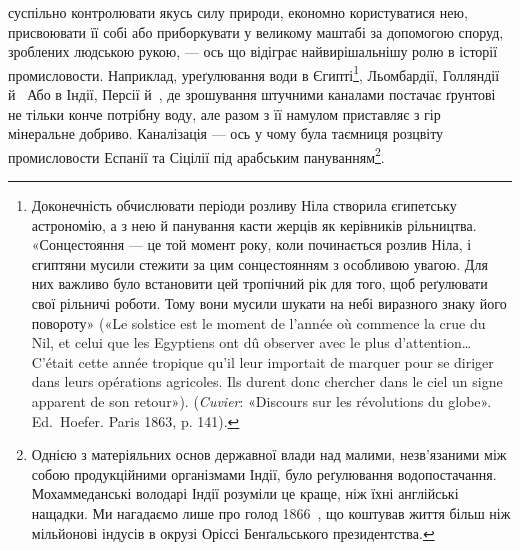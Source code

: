 суспільно контролювати якусь силу природи, економно користуватися
нею, присвоювати її собі або приборкувати у великому
маштабі за допомогою споруд, зроблених людською рукою, —
ось що відіграє найвирішальнішу ролю в історії промисловости.
Наприклад, уреґулювання води в Єгипті\footnote{
Доконечність обчислювати періоди розливу Ніла створила єгипетську
астрономію, а з нею й панування касти жерців як керівників
рільництва. «Сонцестояння — це той момент року, коли починається
розлив Ніла, і єгиптяни мусили стежити за цим сонцестоянням з особливою
увагою. Для них важливо було встановити цей тропічний рік для
того, щоб реґулювати свої рільничі роботи. Тому вони мусили шукати
на небі виразного знаку його повороту» («Le solstice est le moment de
l’année où commence la crue du Nil, et celui que les Egyptiens ont dû
observer avec le plus d’attention\dots{} C’était cette année tropique qu’il leur
importait de marquer pour se diriger dans leurs opérations agricoles. Ils
durent donc chercher dans le ciel un signe apparent de son retour»). (\emph{Cuvier}:
«Discours sur les révolutions du globe». Ed.~Hoefer. Paris 1863, p. 141).
}, Льомбардії, Голляндії
й~ Або в Індії, Персії й~, де зрошування штучними
каналами постачає ґрунтові не тільки конче потрібну воду, але
разом з її намулом приставляє з гір мінеральне добриво. Каналізація
— ось у чому була таємниця розцвіту промисловости Еспанії
та Сіцілії під арабським пануванням\footnote{
Однією з матеріяльних основ державної влади над малими, незв'язаними
між собою продукційними організмами Індії, було реґулювання
водопостачання. Мохаммеданські володарі Індії розуміли це краще,
ніж їхні англійські нащадки. Ми нагадаємо лише про голод 1866~, що
коштував життя більш ніж мільйонові індусів в окрузі Оріссі Бенґальського
президентства.
}.

